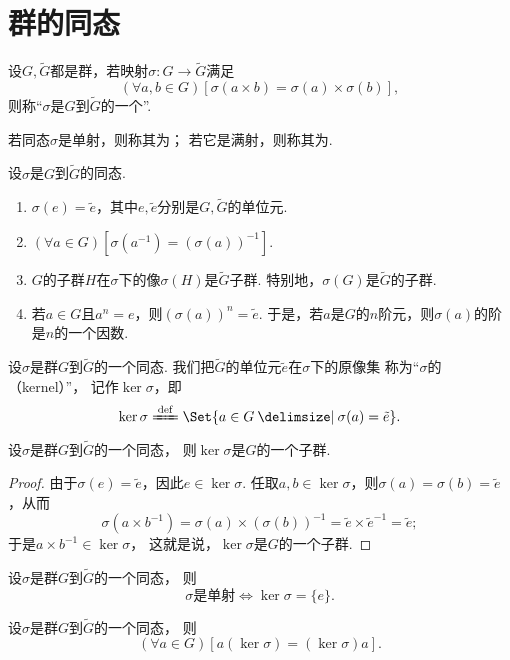 \section{群的同态}
\begin{definition}
设\(G,\tilde{G}\)都是群，若映射\(\sigma\colon G \to \tilde{G}\)满足\[
	(\forall a,b \in G)[\sigma(a \times b) = \sigma(a) \times \sigma(b)],
\]
则称“\(\sigma\)是\(G\)到\(\tilde{G}\)的一个”.

若同态\(\sigma\)是单射，则称其为；
若它是满射，则称其为.
\end{definition}

\begin{property}
设\(\sigma\)是\(G\)到\(\tilde{G}\)的同态.
\begin{enumerate}
	\item \(\sigma(e)=\tilde{e}\)，其中\(e,\tilde{e}\)分别是\(G,\tilde{G}\)的单位元.
	\item \((\forall a \in G)[\sigma(a^{-1})=(\sigma(a))^{-1}]\).
	\item \(G\)的子群\(H\)在\(\sigma\)下的像\(\sigma(H)\)是\(\tilde{G}\)子群.
	特别地，\(\sigma(G)\)是\(\tilde{G}\)的子群.
	\item 若\(a \in G\)且\(a^n = e\)，则\((\sigma(a))^n = \tilde{e}\).
	于是，若\(a\)是\(G\)的\(n\)阶元，则\(\sigma(a)\)的阶是\(n\)的一个因数.
\end{enumerate}
\end{property}

\begin{definition}
设\(\sigma\)是群\(G\)到\(\tilde{G}\)的一个同态.
我们把\(\tilde{G}\)的单位元\(\tilde{e}\)在\(\sigma\)下的原像集%
称为“\(\sigma\)的（kernel）”，
记作\(\ker\sigma\)，即\[
	\ker\sigma \defeq \Set{ a \in G \given \sigma(a) = \tilde{e} }.
\]
\end{definition}

\begin{theorem}
设\(\sigma\)是群\(G\)到\(\tilde{G}\)的一个同态，
则\(\ker\sigma\)是\(G\)的一个子群.
\begin{proof}
由于\(\sigma(e)=\tilde{e}\)，因此\(e\in\ker\sigma\).
任取\(a,b\in\ker\sigma\)，则\(\sigma(a)=\sigma(b)=\tilde{e}\)，从而\[
	\sigma(a \times b^{-1}) = \sigma(a) \times (\sigma(b))^{-1}
	= \tilde{e} \times \tilde{e}^{-1}
	= \tilde{e};
\]
于是\(a \times b^{-1} \in \ker\sigma\)，
这就是说，\(\ker\sigma\)是\(G\)的一个子群.
\end{proof}
\end{theorem}

\begin{theorem}
设\(\sigma\)是群\(G\)到\(\tilde{G}\)的一个同态，
则\[
	\text{\(\sigma\)是单射}
	\iff
	\ker\sigma=\{e\}.
\]
\end{theorem}

\begin{theorem}
设\(\sigma\)是群\(G\)到\(\tilde{G}\)的一个同态，
则\[
	(\forall a \in G)[a(\ker\sigma)=(\ker\sigma)a].
\]
\end{theorem}
